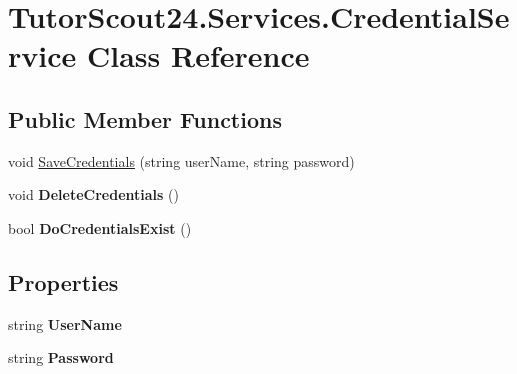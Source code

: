 \hypertarget{class_tutor_scout24_1_1_services_1_1_credential_service}{}\section{Tutor\+Scout24.\+Services.\+Credential\+Service Class Reference}
\label{class_tutor_scout24_1_1_services_1_1_credential_service}
\subsection*{Public Member Functions}
\begin{DoxyCompactItemize}
\item 
void \mbox{\hyperlink{class_tutor_scout24_1_1_services_1_1_credential_service_aec81b84086a196da0572d26634195a06}{Save\+Credentials}} (string user\+Name, string password)
\item 
\mbox{\label{class_tutor_scout24_1_1_services_1_1_credential_service_a814273c96b6376d1a357c4fba7c84e00}} 
void {\bfseries Delete\+Credentials} ()
\item 
\mbox{\label{class_tutor_scout24_1_1_services_1_1_credential_service_a05b7e176e673feec587f9e37d3358bb2}} 
bool {\bfseries Do\+Credentials\+Exist} ()
\end{DoxyCompactItemize}
\subsection*{Properties}
\begin{DoxyCompactItemize}
\item 
\mbox{\label{class_tutor_scout24_1_1_services_1_1_credential_service_aac5c26c32dbbfc3ee2cf92cc9237ce91}} 
string {\bfseries User\+Name}
\item 
\mbox{\label{class_tutor_scout24_1_1_services_1_1_credential_service_a36756353fdcdb8514384d9d04ed2add1}} 
string {\bfseries Password}
\end{DoxyCompactItemize}


